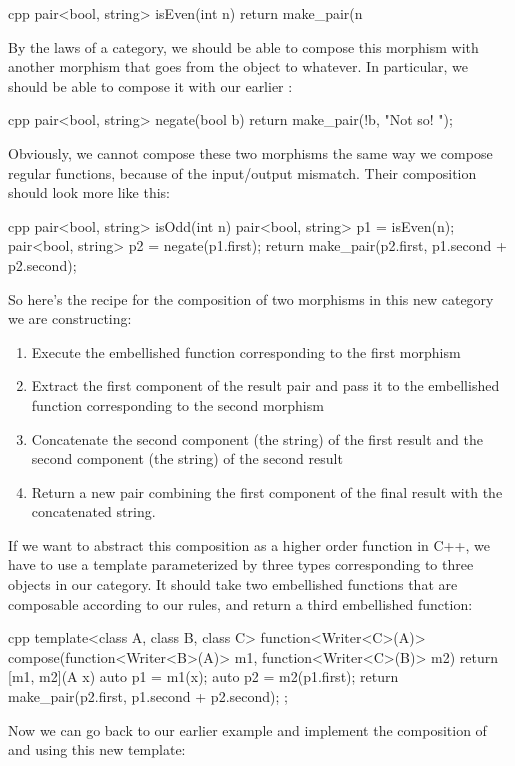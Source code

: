 \begin{snip}{cpp}
pair<bool, string> isEven(int n) {
    return make_pair(n %
}
\end{snip}
By the laws of a category, we should be able to compose this morphism
with another morphism that goes from the object  to
whatever. In particular, we should be able to compose it with our
earlier :

\begin{snip}{cpp}
pair<bool, string> negate(bool b) {
    return make_pair(!b, "Not so! ");
}
\end{snip}
Obviously, we cannot compose these two morphisms the same way we compose
regular functions, because of the input/output mismatch. Their
composition should look more like this:

\begin{snip}{cpp}
pair<bool, string> isOdd(int n) {
    pair<bool, string> p1 = isEven(n);
    pair<bool, string> p2 = negate(p1.first);
    return make_pair(p2.first, p1.second + p2.second);
}
\end{snip}
So here's the recipe for the composition of two morphisms in this new
category we are constructing:

\begin{enumerate}
  \tightlist
  \item
        Execute the embellished function corresponding to the first morphism
  \item
        Extract the first component of the result pair and pass it to the
        embellished function corresponding to the second morphism
  \item
        Concatenate the second component (the string) of the first result
        and the second component (the string) of the second result
  \item
        Return a new pair combining the first component of the final result
        with the concatenated string.
\end{enumerate}

If we want to abstract this composition as a higher order function in
C++, we have to use a template parameterized by three types
corresponding to three objects in our category. It should take two
embellished functions that are composable according to our rules, and
return a third embellished function:

\begin{snip}{cpp}
template<class A, class B, class C>
function<Writer<C>(A)> compose(function<Writer<B>(A)> m1,
                               function<Writer<C>(B)> m2)
{
    return [m1, m2](A x) {
        auto p1 = m1(x);
        auto p2 = m2(p1.first);
        return make_pair(p2.first, p1.second + p2.second);
    };
}
\end{snip}
Now we can go back to our earlier example and implement the composition
of  and  using this new template:

